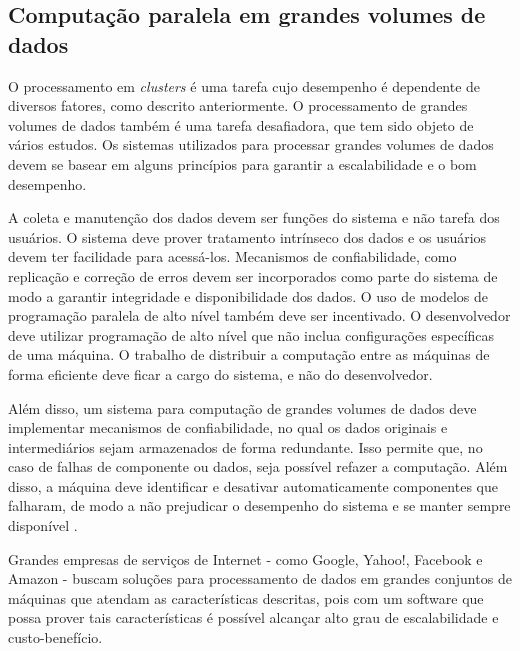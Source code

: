 \subsection{Computação paralela em grandes volumes de dados}
O processamento em \textit{clusters} é uma tarefa cujo desempenho é dependente de diversos fatores, como descrito anteriormente. O processamento de grandes volumes de dados também é uma tarefa desafiadora, que tem sido objeto de vários estudos. Os sistemas utilizados para processar grandes volumes de dados devem se basear em alguns princípios para garantir a escalabilidade e o bom desempenho.

A coleta e manutenção dos dados devem ser funções do sistema e não tarefa dos usuários. O sistema deve prover tratamento intrínseco dos dados  e os usuários devem ter facilidade para acessá-los. Mecanismos de confiabilidade, como replicação e  correção de erros devem ser incorporados como parte do sistema de modo a garantir integridade e disponibilidade dos dados.
O uso de modelos de programação paralela de alto nível também deve ser incentivado. O desenvolvedor deve utilizar programação de alto nível que não inclua configurações específicas de uma máquina. O trabalho de distribuir a computação entre as máquinas de forma eficiente deve ficar a cargo do sistema, e não do desenvolvedor.


Além disso, um sistema para computação de grandes volumes de dados deve implementar mecanismos de confiabilidade, no qual os dados originais e intermediários sejam armazenados de forma redundante. Isso permite que, no caso de falhas de componente ou dados, seja possível refazer a computação. Além disso, a máquina deve identificar e desativar automaticamente componentes que falharam, de modo a não prejudicar o desempenho do sistema e se manter sempre disponível \cite{Bryant:2011}.

Grandes empresas de serviços de Internet - como Google, Yahoo!, Facebook e Amazon - buscam soluções para processamento de dados em grandes conjuntos de máquinas que atendam as características descritas, pois com um software que possa prover tais características é possível alcançar alto grau de escalabilidade e custo-benefício. 

